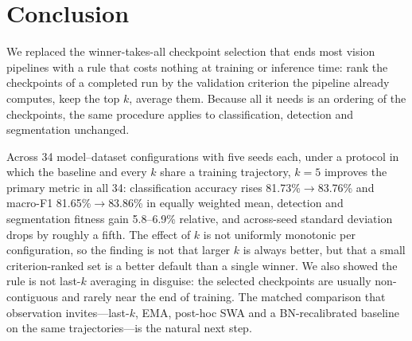 \section{Conclusion}
\label{sec:conclusion}

We replaced the winner-takes-all checkpoint selection that ends most vision
pipelines with a rule that costs nothing at training or inference time: rank
the checkpoints of a completed run by the validation criterion the pipeline
already computes, keep the top $k$, average them. Because all it needs is an
ordering of the checkpoints, the same procedure applies to classification,
detection and segmentation unchanged.

Across 34 model--dataset configurations with five seeds each, under a protocol
in which the baseline and every $k$ share a training trajectory, $k{=}5$
improves the primary metric in all 34: classification accuracy rises
81.73\%$\to$83.76\% and macro-F1 81.65\%$\to$83.86\% in equally weighted mean,
detection and segmentation fitness gain 5.8--6.9\% relative, and across-seed
standard deviation drops by roughly a fifth. The effect of $k$ is not uniformly
monotonic per configuration, so the finding is not that larger $k$ is always
better, but that a small criterion-ranked set is a better default than a single
winner. We also showed the rule is not last-$k$ averaging in disguise: the
selected checkpoints are usually non-contiguous and rarely near the end of
training. The matched comparison that observation invites---last-$k$, EMA,
post-hoc SWA and a BN-recalibrated baseline on the same trajectories---is the
natural next step.
